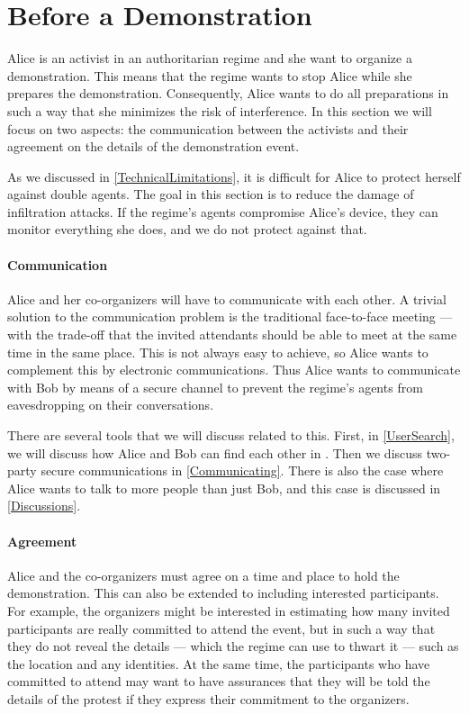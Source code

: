 \section{Before a Demonstration}
\label{BeforeProtest}

Alice is an activist in an authoritarian regime and she want to organize 
a demonstration.
This means that the regime wants to stop Alice while she prepares the 
demonstration.
Consequently, Alice wants to do all preparations in such a way that she 
minimizes the risk of interference.
In this section we will focus on two aspects: the communication between the 
activists and their agreement on the details of the demonstration event.


As we discussed in \cref{TechnicalLimitations}, it is difficult for Alice to 
protect herself against double agents.
The goal in this section is to reduce the damage of infiltration attacks.
If the regime's agents compromise Alice's device, they can monitor everything 
she does, and we do not protect against that.

\paragraph{Communication}

Alice and her co-organizers will have to communicate with each other.
A trivial solution to the communication problem is the traditional face-to-face 
meeting --- with the trade-off that the invited attendants should be able to 
meet at the same time in the same place.
This is not always easy to achieve, so Alice wants to complement this by 
electronic communications.
Thus Alice wants to communicate with Bob by means of a secure channel to 
prevent the regime's agents from eavesdropping on their conversations.

There are several tools that we will discuss related to this.
First, in \cref{UserSearch}, we will discuss how Alice and Bob can find each 
other in .
Then we discuss two-party secure communications in \cref{Communicating}.
There is also the case where Alice wants to talk to more people than just Bob, 
and this case is discussed in \cref{Discussions}.

\paragraph{Agreement}

Alice and the co-organizers must agree on a time and place to hold the 
demonstration.
This can also be extended to including interested participants.
For example, the organizers might be interested in estimating how many invited 
participants are really committed to attend the event, but in such a way that 
they do not reveal the details --- which the regime can use to thwart it --- 
such as the location and any identities.
At the same time, the participants who have committed to attend may want to 
have assurances that they will be told the details of the protest if they 
express their commitment to the organizers.


